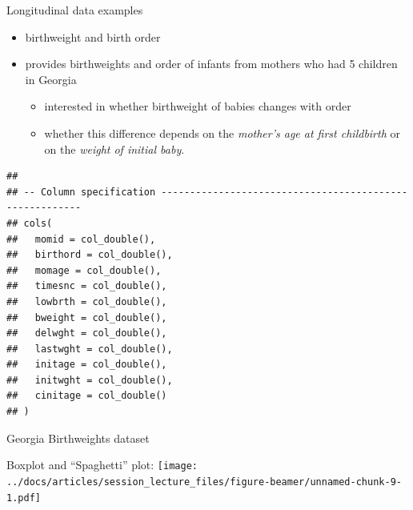 \documentclass[
  ignorenonframetext,
]{beamer}
\providecommand{\tightlist}{%
  \setlength{\itemsep}{0pt}\setlength{\parskip}{0pt}}
\begin{document}
\begin{frame}[fragile]{Longitudinal data examples}
\protect\hypertarget{longitudinal-data-examples-1}{}

\begin{itemize}
\tightlist
\item
  birthweight and birth order
\item
  provides birthweights and order of infants from mothers who had 5
  children in Georgia

  \begin{itemize}
  \tightlist
  \item
    interested in whether birthweight of babies changes with order
  \item
    whether this difference depends on the \emph{mother's age at first
    childbirth} or on the \emph{weight of initial baby}.
  \end{itemize}
\end{itemize}

\begin{verbatim}
## 
## -- Column specification --------------------------------------------------------
## cols(
##   momid = col_double(),
##   birthord = col_double(),
##   momage = col_double(),
##   timesnc = col_double(),
##   lowbrth = col_double(),
##   bweight = col_double(),
##   delwght = col_double(),
##   lastwght = col_double(),
##   initage = col_double(),
##   initwght = col_double(),
##   cinitage = col_double()
## )
\end{verbatim}

\end{frame}

\begin{frame}{Georgia Birthweights dataset}
\protect\hypertarget{georgia-birthweights-dataset}{}

Boxplot and ``Spaghetti'' plot:
\texttt{[image: ../docs/articles/session\_lecture\_files/figure-beamer/unnamed-chunk-9-1.pdf]}

\end{frame}
\end{document}
